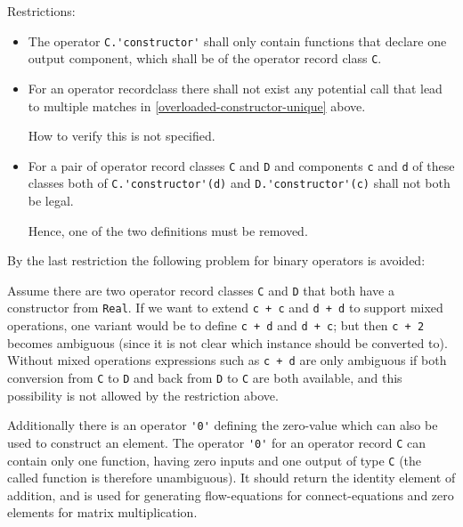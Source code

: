 Restrictions:
\begin{itemize}
\item
  The operator \lstinline!C.'constructor'! shall only contain functions that declare one output component, which shall be of the operator record class \lstinline!C!.
\item
  For an operator recordclass there shall not exist any potential call that lead to multiple matches in \cref{overloaded-constructor-unique} above.
  \begin{nonnormative}
  How to verify this is not specified.
  \end{nonnormative}
\item
  For a pair of operator record classes \lstinline!C! and \lstinline!D! and components \lstinline!c! and \lstinline!d! of these classes both of \lstinline!C.'constructor'(d)! and \lstinline!D.'constructor'(c)! shall not both be legal.
  \begin{nonnormative}
   Hence, one of the two definitions must be removed.
  \end{nonnormative}
\end{itemize}

\begin{nonnormative}
By the last restriction the following problem for binary operators is avoided:

Assume there are two operator record classes \lstinline!C! and \lstinline!D! that both have a constructor from \lstinline!Real!.  If we want to extend \lstinline!c + c! and \lstinline!d + d! to support mixed operations, one variant would be to define \lstinline!c + d! and \lstinline!d + c!; but then \lstinline!c + 2! becomes ambiguous (since it is not clear which instance should be converted to).  Without mixed operations expressions such as \lstinline!c + d! are only ambiguous if both conversion from \lstinline!C! to \lstinline!D! and back from \lstinline!D! to \lstinline!C! are both available, and this possibility is not allowed by the restriction above.
\end{nonnormative}

Additionally there is an operator \lstinline!'0'! defining the zero-value which can also be used to construct an element.  The operator \lstinline!'0'! for an operator record \lstinline!C! can
contain only one function, having zero inputs and one output of type \lstinline!C! (the called function is therefore unambiguous).  It should return the identity element of addition, and is used for
generating flow-equations for connect-equations and zero elements for matrix multiplication.

